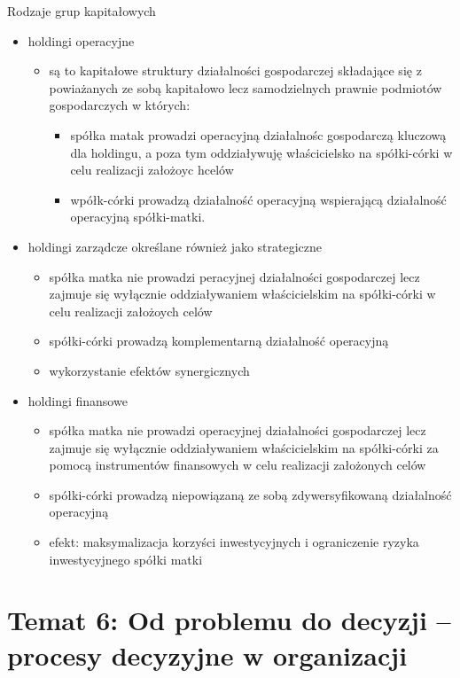 \documentclass[a4paper,10pt]{report}
\begin{document}
Rodzaje grup kapitałowych
\begin{itemize}
	\item holdingi operacyjne
	\begin{itemize}
		\item są to kapitałowe struktury działalności gospodarczej składające się z powiażanych ze sobą kapitałowo lecz samodzielnych prawnie podmiotów gospodarczych w których:
		\begin{itemize}
			\item spółka matak prowadzi operacyjną działalnośc gospodarczą kluczową dla holdingu, a poza tym oddziaływuję właścicielsko na spółki-córki w celu realizacji założoyc hcelów
			\item wpółk-córki prowadzą działalność operacyjną wspierającą działalność operacyjną spółki-matki.
		\end{itemize}
	\end{itemize}
	\item holdingi zarządcze określane również jako strategiczne
	\begin{itemize}
		\item spółka matka nie prowadzi peracyjnej działalności gospodarczej lecz zajmuje się wyłącznie oddziaływaniem właścicielskim na spółki-córki w celu realizacji założoych celów
		\item spółki-córki prowadzą komplementarną działalność operacyjną
		\item wykorzystanie efektów synergicznych
	\end{itemize}
	\item holdingi finansowe
	\begin{itemize}
		\item spółka matka nie prowadzi operacyjnej działalności gospodarczej lecz zajmuje się wyłącznie oddziaływaniem właścicielskim na spółki-córki za pomocą instrumentów finansowych w celu realizacji założonych celów
		\item spółki-córki prowadzą niepowiązaną ze sobą zdywersyfikowaną działalność operacyjną
		\item efekt: maksymalizacja korzyści inwestycyjnych i ograniczenie ryzyka inwestycyjnego spółki matki
	\end{itemize}
\end{itemize}

\chapter{Temat 6: Od problemu do decyzji -- procesy decyzyjne w organizacji}
\end{document}
